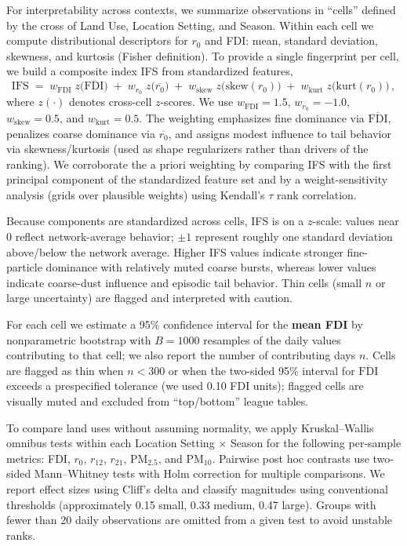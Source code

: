 \documentclass[a4paper,fleqn]{cas-sc}
\begin{document}
For interpretability across contexts, we summarize observations in “cells” defined by the cross of Land Use, Location Setting, and Season. Within each cell we compute distributional descriptors for $r_{0}$ and FDI: mean, standard deviation, skewness, and kurtosis (Fisher definition). To provide a single fingerprint per cell, we build a composite index IFS from standardized features,
\begin{equation}
\mathrm{IFS} \;=\; w_{\mathrm{FDI}}\;z\!\big(\overline{\mathrm{FDI}}\big)
 \;+\; w_{r_0}\;z\!\big(\overline{r_{0}}\big)
 \;+\; w_{\mathrm{skew}}\;z\!\big(\mathrm{skew}(r_{0})\big)
 \;+\; w_{\mathrm{kurt}}\;z\!\big(\mathrm{kurt}(r_{0})\big)\,,
\end{equation}
where $z(\cdot)$ denotes cross-cell $z$-scores. We use $w_{\mathrm{FDI}}=1.5$, $w_{r_0}=-1.0$, $w_{\mathrm{skew}}=0.5$, and $w_{\mathrm{kurt}}=0.5$. The weighting emphasizes fine dominance via $\overline{\mathrm{FDI}}$, penalizes coarse dominance via $\overline{r_0}$, and assigns modest influence to tail behavior via skewness/kurtosis (used as shape regularizers rather than drivers of the ranking). We corroborate the a priori weighting by comparing IFS with the first principal component of the standardized feature set and by a weight-sensitivity analysis (grids over plausible weights) using Kendall’s $\tau$ rank correlation.

Because components are standardized across cells, IFS is on a $z$-scale: values near 0 reflect network-average behavior; $\pm 1$ represent roughly one standard deviation above/below the network average. Higher IFS values indicate stronger fine-particle dominance with relatively muted coarse bursts, whereas lower values indicate coarse-dust influence and episodic tail behavior. Thin cells (small $n$ or large uncertainty) are flagged and interpreted with caution.

For each cell we estimate a 95\% confidence interval for the \textbf{mean FDI} by nonparametric bootstrap with $B=1000$ resamples of the daily values contributing to that cell; we also report the number of contributing days $n$. Cells are flagged as thin when $n<300$ or when the two-sided 95\% interval for $\overline{\mathrm{FDI}}$ exceeds a prespecified tolerance (we used 0.10 FDI units); flagged cells are visually muted and excluded from “top/bottom” league tables.

To compare land uses without assuming normality, we apply Kruskal--Wallis omnibus tests \citep{Lachenbruch1991, MacFarland2016} within each Location Setting $\times$ Season for the following per-sample metrics: FDI, $r_{0}$, $r_{12}$, $r_{21}$, PM$_{2.5}$, and PM$_{10}$. Pairwise post hoc contrasts use two-sided Mann--Whitney tests \citep{Nasr2025, Grzegorzewski2018} with Holm correction for multiple comparisons. We report effect sizes using Cliff’s delta \citep{Kala2024, Meissel2024} and classify magnitudes using conventional thresholds (approximately 0.15 small, 0.33 medium, 0.47 large). Groups with fewer than 20 daily observations are omitted from a given test to avoid unstable ranks.
\end{document}
